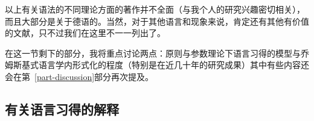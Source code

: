 以上有关语法的不同理论方面的著作并不全面（与我个人的研究兴趣密切相关），而且大部分是关于德语的。当然，对于其他语言和现象来说，肯定还有其他有价值的文献，只不过我们在这里不一一列出了。

在这一节剩下的部分，我将重点讨论两点：原则与参数理论下语言习得的模型与乔姆斯基式语言学内形式化的程度（特别是在近几十年的研究成果）其中有些内容还会在第~\ref{part-discussion}部分再次提及。

\subsection{有关语言习得的解释}
\label{sec-acquisition-gb}

